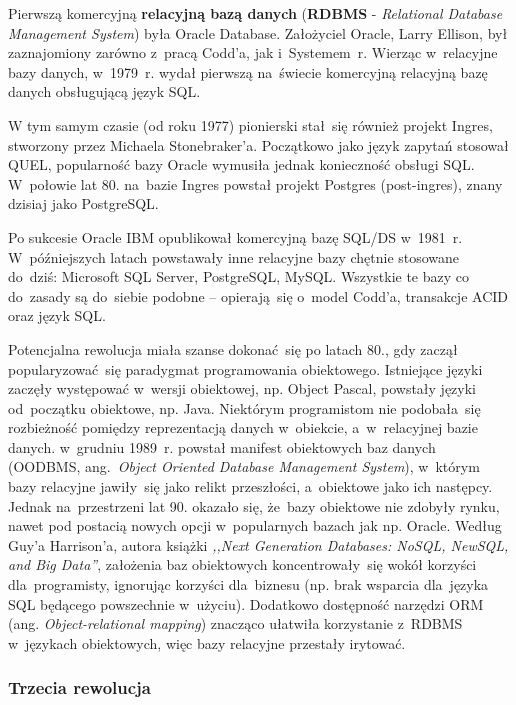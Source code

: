 \documentclass[12pt,a4paper,twoside,titlepage,openright]{book}
\begin{document}
Pierwszą komercyjną \textbf{relacyjną bazą danych} (\textbf{RDBMS} - \textit{Relational Database Management System}) była Oracle Database. Założyciel Oracle, Larry Ellison, był zaznajomiony zarówno z~pracą Codd'a, jak i~Systemem~r. Wierząc w~relacyjne bazy danych, w~1979~r. wydał pierwszą na~świecie komercyjną relacyjną bazę danych obsługującą język SQL. \cite{relationalDbs}

W tym samym czasie (od roku 1977) pionierski stał~się również projekt Ingres, stworzony przez Michaela Stonebraker'a. Początkowo jako język zapytań stosował QUEL, popularność bazy Oracle wymusiła jednak konieczność obsługi SQL. W~połowie lat 80. na~bazie Ingres powstał projekt Postgres (post-ingres), znany dzisiaj jako PostgreSQL. 

Po sukcesie Oracle IBM opublikował komercyjną bazę SQL/DS w~1981~r. W~późniejszych latach powstawały inne relacyjne bazy chętnie stosowane do~dziś: Microsoft SQL Server, PostgreSQL, MySQL. Wszystkie te bazy co do~zasady są do~siebie podobne -- opierają~się o~model Codd'a, transakcje ACID oraz język SQL. \cite{relationalDbs}

Potencjalna rewolucja miała szanse dokonać~się po latach 80., gdy zaczął popularyzować~się paradygmat programowania obiektowego. Istniejące języki zaczęły występować w~wersji obiektowej, np. Object Pascal, powstały języki od~początku obiektowe, np. Java. Niektórym programistom nie podobała~się rozbieżność pomiędzy reprezentacją danych w~obiekcie, a~w~relacyjnej bazie danych. w~grudniu 1989~r. powstał manifest obiektowych baz danych (OODBMS, ang.~\textit{Object Oriented Database Management System}), w~którym bazy relacyjne jawiły~się jako relikt przeszłości, a~obiektowe jako ich następcy.\cite{oodbmsManifesto} Jednak na~przestrzeni lat 90. okazało się, że~bazy obiektowe nie zdobyły rynku, nawet pod postacią nowych opcji w~popularnych bazach jak np. Oracle. Według Guy'a Harrison'a, autora książki \textit{,,Next Generation Databases: NoSQL, NewSQL, and Big Data''}, założenia baz obiektowych koncentrowały~się wokół korzyści dla~programisty, ignorując korzyści dla~biznesu (np. brak wsparcia dla~języka SQL będącego powszechnie w~użyciu). Dodatkowo dostępność narzędzi ORM (ang. \textit{Object-relational mapping}) znacząco ułatwiła korzystanie z~RDBMS w~językach obiektowych, więc bazy relacyjne przestały irytować.

\subsubsection{Trzecia rewolucja}
\end{document}
